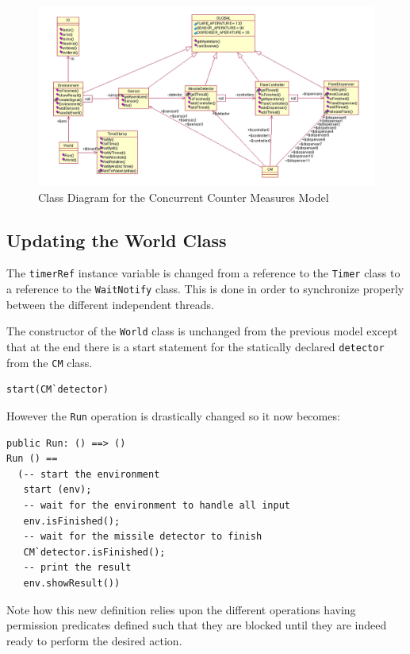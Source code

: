 \documentclass{overturerepchap}
\begin{document}
\begin{figure}
\begin{center}
\includegraphics[width=\textwidth]{figures/concurCMclassdiag.png}
\end{center}
\caption{Class Diagram for the Concurrent Counter Measures Model\label{fig:classdiagconcur}}
\end{figure}

\subsection{Updating the World Class}

The \texttt{timerRef} instance variable is changed from a reference to 
the \texttt{Timer} class to a reference to the \texttt{WaitNotify} class.
This is done in order to synchronize properly between the different 
independent threads.

The constructor of the \texttt{World} class is unchanged from the 
previous model except that at the end there is a start statement
for the statically declared \texttt{detector} from the \texttt{CM} class.

\begin{lstlisting}
start(CM`detector)
\end{lstlisting}

However the \texttt{Run} operation is drastically changed so it now becomes:

\begin{lstlisting}
public Run: () ==> ()
Run () == 
  (-- start the environment
   start (env);
   -- wait for the environment to handle all input
   env.isFinished();
   -- wait for the missile detector to finish
   CM`detector.isFinished();
   -- print the result
   env.showResult())
\end{lstlisting}

Note how this new definition relies upon the different operations
having permission predicates defined such that they are blocked until
they are indeed ready to perform the desired action.
\end{document}
